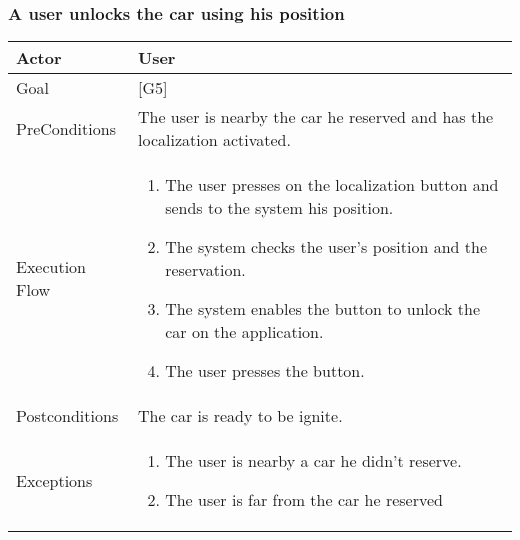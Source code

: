 \documentclass{article}
\begin{document}
	\subsubsection{A user unlocks the car using his position}
	\begin{tabularx}{\textwidth}{  l  X  }
		\hline
		Actor & User\\
		\hline
		Goal & [G5]\\
		\hline
		PreConditions & The user is nearby the car he reserved and has the localization activated.\\
		\hline
		Execution Flow & \begin{enumerate}
			\item{The user presses on the localization button and sends to the system his position.}
										 \item{The system checks the user's position and the reservation.}
										 \item{The system enables the button to unlock the car on the application.}
										 \item{The user presses the button.}
										\end{enumerate}\\
		\hline
		Postconditions & The car is ready to be ignite.\\
		\hline
		Exceptions & \begin{enumerate}
			\item{The user is nearby a car he didn't reserve.}
								 \item{The user is far from the car he reserved}
								\end{enumerate}\\
		\hline
	\end{tabularx}
\end{document}
